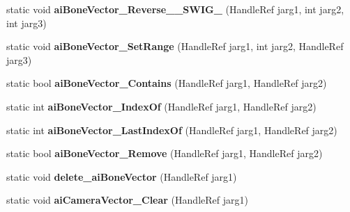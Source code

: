 \begin{DoxyCompactItemize}
\item 
\hypertarget{class_assimp_p_i_n_v_o_k_e_a1346cdb1edfd349dd8e6cf3b8384dd56}{static void {\bfseries ai\+Bone\+Vector\+\_\+\+Reverse\+\_\+\+\_\+\+S\+W\+I\+G\+\_} (Handle\+Ref jarg1, int jarg2, int jarg3)}\label{class_assimp_p_i_n_v_o_k_e_a1346cdb1edfd349dd8e6cf3b8384dd56}

\item 
\hypertarget{class_assimp_p_i_n_v_o_k_e_a5141cbe0341a64f504886502bd1aabbf}{static void {\bfseries ai\+Bone\+Vector\+\_\+\+Set\+Range} (Handle\+Ref jarg1, int jarg2, Handle\+Ref jarg3)}\label{class_assimp_p_i_n_v_o_k_e_a5141cbe0341a64f504886502bd1aabbf}

\item 
\hypertarget{class_assimp_p_i_n_v_o_k_e_a0c7f944d9b715ed4eff16d2801932988}{static bool {\bfseries ai\+Bone\+Vector\+\_\+\+Contains} (Handle\+Ref jarg1, Handle\+Ref jarg2)}\label{class_assimp_p_i_n_v_o_k_e_a0c7f944d9b715ed4eff16d2801932988}

\item 
\hypertarget{class_assimp_p_i_n_v_o_k_e_ac34dde14633c2d8d3b6db5cb26189cc7}{static int {\bfseries ai\+Bone\+Vector\+\_\+\+Index\+Of} (Handle\+Ref jarg1, Handle\+Ref jarg2)}\label{class_assimp_p_i_n_v_o_k_e_ac34dde14633c2d8d3b6db5cb26189cc7}

\item 
\hypertarget{class_assimp_p_i_n_v_o_k_e_a55e61d5b2e15d158d23038f424666a0e}{static int {\bfseries ai\+Bone\+Vector\+\_\+\+Last\+Index\+Of} (Handle\+Ref jarg1, Handle\+Ref jarg2)}\label{class_assimp_p_i_n_v_o_k_e_a55e61d5b2e15d158d23038f424666a0e}

\item 
\hypertarget{class_assimp_p_i_n_v_o_k_e_addc72dad96ad29b05078a7db4c83f6e4}{static bool {\bfseries ai\+Bone\+Vector\+\_\+\+Remove} (Handle\+Ref jarg1, Handle\+Ref jarg2)}\label{class_assimp_p_i_n_v_o_k_e_addc72dad96ad29b05078a7db4c83f6e4}

\item 
\hypertarget{class_assimp_p_i_n_v_o_k_e_a962d3d28d719147f77d41e23eb453579}{static void {\bfseries delete\+\_\+ai\+Bone\+Vector} (Handle\+Ref jarg1)}\label{class_assimp_p_i_n_v_o_k_e_a962d3d28d719147f77d41e23eb453579}

\item 
\hypertarget{class_assimp_p_i_n_v_o_k_e_a7aed96fcd17f3f87ddfd3cdb04742582}{static void {\bfseries ai\+Camera\+Vector\+\_\+\+Clear} (Handle\+Ref jarg1)}\label{class_assimp_p_i_n_v_o_k_e_a7aed96fcd17f3f87ddfd3cdb04742582}


\end{DoxyCompactItemize}
